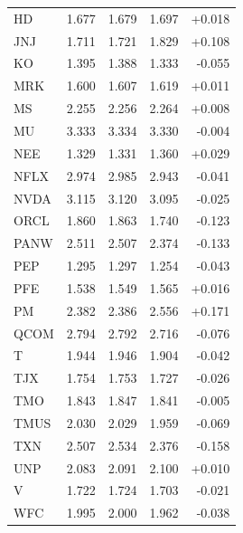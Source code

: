 \documentclass[12pt,a4paper]{article}
\begin{document}
\begin{longtable}{lrrrr}
HD & 1.677 & 1.679 & 1.697 & +0.018 \\
JNJ & 1.711 & 1.721 & 1.829 & +0.108 \\
KO & 1.395 & 1.388 & 1.333 & -0.055 \\
MRK & 1.600 & 1.607 & 1.619 & +0.011 \\
MS & 2.255 & 2.256 & 2.264 & +0.008 \\
MU & 3.333 & 3.334 & 3.330 & -0.004 \\
NEE & 1.329 & 1.331 & 1.360 & +0.029 \\
NFLX & 2.974 & 2.985 & 2.943 & -0.041 \\
NVDA & 3.115 & 3.120 & 3.095 & -0.025 \\
ORCL & 1.860 & 1.863 & 1.740 & -0.123 \\
PANW & 2.511 & 2.507 & 2.374 & -0.133 \\
PEP & 1.295 & 1.297 & 1.254 & -0.043 \\
PFE & 1.538 & 1.549 & 1.565 & +0.016 \\
PM & 2.382 & 2.386 & 2.556 & +0.171 \\
QCOM & 2.794 & 2.792 & 2.716 & -0.076 \\
T & 1.944 & 1.946 & 1.904 & -0.042 \\
TJX & 1.754 & 1.753 & 1.727 & -0.026 \\
TMO & 1.843 & 1.847 & 1.841 & -0.005 \\
TMUS & 2.030 & 2.029 & 1.959 & -0.069 \\
TXN & 2.507 & 2.534 & 2.376 & -0.158 \\
UNP & 2.083 & 2.091 & 2.100 & +0.010 \\
V & 1.722 & 1.724 & 1.703 & -0.021 \\
WFC & 1.995 & 2.000 & 1.962 & -0.038 \\
\end{longtable}
\end{document}
